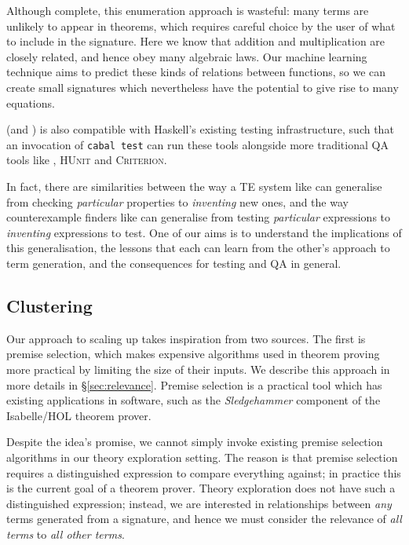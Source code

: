 Although complete, this enumeration approach is wasteful: many terms are unlikely to appear in theorems, which requires careful choice by the user of what to include in the signature. Here we know that addition and multiplication are closely related, and hence obey many algebraic laws. Our machine learning technique aims to predict these kinds of relations between functions, so we can create small signatures which nevertheless have the potential to give rise to many equations.

\qspec{} (and \hspec{}) is also compatible with Haskell's existing testing infrastructure, such that an invocation of \texttt{cabal test} can run these tools alongside more traditional QA tools like \qcheck{}, \textsc{HUnit} and \textsc{Criterion}.

In fact, there are similarities between the way a TE system like \qspec{} can generalise from checking \emph{particular} properties to \emph{inventing} new ones, and the way counterexample finders like \qcheck{} can generalise from testing \emph{particular} expressions to \emph{inventing} expressions to test. One of our aims is to understand the implications of this generalisation, the lessons that each can learn from the other's approach to term generation, and the consequences for testing and QA in general.

\subsection{Clustering}
\label{sec:clustering}

Our approach to scaling up \qspec{} takes inspiration from two sources. The first is premise selection, which makes expensive algorithms used in theorem proving more practical by limiting the size of their inputs. We describe this approach in more details in \S \ref{sec:relevance}. Premise selection is a practical tool which has existing applications in software, such as the \emph{Sledgehammer} component of the Isabelle/HOL theorem prover.

Despite the idea's promise, we cannot simply invoke existing premise selection algorithms in our theory exploration setting. The reason is that premise selection requires a distinguished expression to compare everything against; in practice this is the current goal of a theorem prover. Theory exploration does not have such a distinguished expression; instead, we are interested in relationships between \emph{any} terms generated from a signature, and hence we must consider the relevance of \emph{all terms} to \emph{all other terms}.

